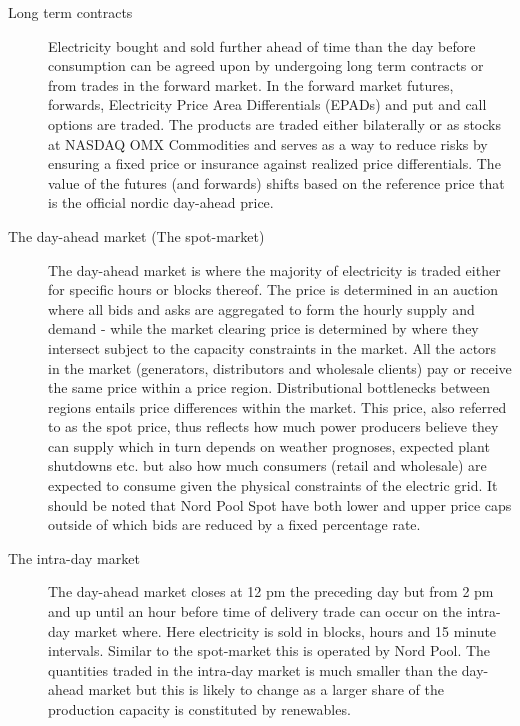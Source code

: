 \begin{description}

    \item [Long term contracts] 
    Electricity bought and sold further ahead of time than the day before consumption can be agreed upon by undergoing long term contracts or from trades in the forward market. In the forward market futures, forwards, Electricity Price Area Differentials (EPADs) and put and call options are traded. The products are traded either bilaterally or as stocks at NASDAQ OMX Commodities and serves as a way to reduce risks by ensuring a fixed price or insurance against realized price differentials. The value of the futures (and forwards) shifts based on the reference price that is the official nordic day-ahead price. 
    
    \item [The day-ahead market (The spot-market)]
    The day-ahead market is where the majority of electricity is traded either for specific hours or blocks thereof. The price is determined in an auction where all bids and asks are aggregated to form the hourly supply and demand - while the market clearing price is determined by where they intersect subject to the capacity constraints in the market. All the actors in the market (generators, distributors and wholesale clients) pay or receive the same price within a price region. Distributional bottlenecks between regions entails price differences within the market. This price, also referred to as the spot price, thus reflects how much power producers believe they can supply which in turn depends on weather prognoses, expected plant shutdowns etc. but also how much consumers (retail and wholesale) are expected to consume given the physical constraints of the electric grid. It should be noted that Nord Pool Spot have both lower and upper price caps outside of which bids are reduced by a fixed percentage rate.   
  
    \item [The intra-day market]
     The day-ahead market closes at 12 pm the preceding day but from 2 pm and up until an hour before time of delivery trade can occur on the intra-day market where. Here electricity is sold in blocks, hours and 15 minute intervals. Similar to the spot-market this is operated by Nord Pool. The quantities traded in the intra-day market is much smaller than the day-ahead market but this is likely to change as a larger share of the production capacity is constituted by renewables. %
    

\end{description}
